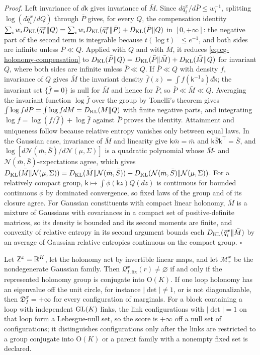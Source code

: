 \noindent\emph{Proof.}
Left invariance of $d\mathsf k$ gives invariance of $\bar M$. Since $d\bar q^x_i/d\bar P\leq w_i^{-1}$,
splitting $\log(d\bar q^x_i/dQ)$ through $\bar P$ gives, for every $Q$, the compensation identity
$\sum_iw_iD_{\mathrm{KL}}(\bar q^x_i\Vert Q)=\sum_iw_iD_{\mathrm{KL}}(\bar q^x_i\Vert\bar P)+D_{\mathrm{KL}}(\bar P\Vert Q)$ in $[0,+\infty]$: the
negative part of the second term is integrable because $t(\log t)^-\leq e^{-1}$, and both sides are
infinite unless $\bar P\ll Q$. Applied with $Q$ and with $\bar M$, it reduces
\eqref{eq:cg-holonomy-compensation} to $D_{\mathrm{KL}}(\bar P\Vert Q)=D_{\mathrm{KL}}(\bar P\Vert\bar M)+D_{\mathrm{KL}}(\bar M\Vert Q)$ for
invariant $Q$, where both sides are infinite unless $\bar P\ll Q$. If $\bar P\ll Q$ with density $f$,
invariance of $Q$ gives $\bar M$ the invariant density $\bar f(z)=\int f(\mathsf k^{-1}z)d\mathsf k$; the
invariant set $\{\bar f=0\}$ is null for $\bar M$ and hence for $\bar P$, so $\bar P\ll\bar M\ll Q$. Averaging
the invariant function $\log\bar f$ over the group by Tonelli's theorem gives
$\int\log\bar fd\bar P=\int\log\bar fd\bar M=D_{\mathrm{KL}}(\bar M\Vert Q)$ with finite negative parts, and integrating
$\log f=\log(f/\bar f)+\log\bar f$ against $\bar P$ proves the identity. Attainment and uniqueness follow
because relative entropy vanishes only between equal laws. In the Gaussian case, invariance of $\bar M$ and
linearity give $\mathsf k\bar m=\bar m$ and $\mathsf k\bar S\mathsf k^\top=\bar S$, and
$\log[d\mathcal N(\bar m,\bar S)/d\mathcal N(\mu,\Sigma)]$ is a quadratic polynomial whose $\bar M$- and
$\mathcal N(\bar m,\bar S)$-expectations agree, which gives
$D_{\mathrm{KL}}(\bar M\Vert\mathcal N(\mu,\Sigma))=D_{\mathrm{KL}}(\bar M\Vert\mathcal N(\bar m,\bar S))+D_{\mathrm{KL}}(\mathcal N(\bar m,\bar S)\Vert\mathcal N(\mu,\Sigma))$.
For a relatively compact group, $\mathsf k\mapsto\int\phi(\mathsf kz)Q(dz)$ is continuous for bounded
continuous $\phi$ by dominated convergence, so fixed laws of the group and of its closure agree. For
Gaussian constituents with compact linear holonomy, $\bar M$ is a mixture of Gaussians with covariances in
a compact set of positive-definite matrices, so its density is bounded and its second moments are finite,
and convexity of relative entropy in its second argument bounds each $D_{\mathrm{KL}}(\bar q^x_i\Vert\bar M)$ by an
average of Gaussian relative entropies continuous on the compact group. $\square$

Let $\mathsf Z^x=\mathbb R^K$, let the holonomy act by invertible linear maps, and let $\mathscr M^x_r$ be the
nondegenerate Gaussian family. Then $\mathscr Q^x_{I,\mathrm{fix}}(r)\neq\varnothing$ if and only if the
represented holonomy group is conjugate into $\mathrm O(K)$. If one loop holonomy has an eigenvalue off the
unit circle, for instance $\lvert\det\rvert\neq1$, or is not diagonalizable, then $\mathfrak D^x_I=+\infty$
for every configuration of marginals. For a block containing a loop with independent $\mathrm{GL}(K)$ links, the
link configurations with $\lvert\det\rvert=1$ on that loop form a Lebesgue-null set, so the score is
$+\infty$ off a null set of configurations; it distinguishes configurations only after the links are
restricted to a group conjugate into $\mathrm O(K)$ or a parent family with a nonempty fixed set is
declared. 

